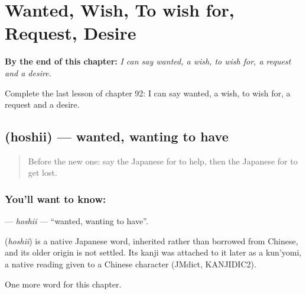 
\chapter{Wanted, Wish, To wish for, Request, Desire}
\label{ch:ja-wanted-wish-to-wish-for-request-desire}

\begin{chapteropening}
\textbf{By the end of this chapter:} \emph{I can say wanted, a wish, to wish for, a request and a desire.}

Complete the last lesson of chapter 92: I can say wanted, a wish, to wish for, a request and a desire.
\end{chapteropening}

\section[\texorpdfstring{\ja{ほしい} (hoshii)}{ほしい (hoshii)}]{ (hoshii) — wanted, wanting to have}

\label{lesson:JA-C92-hoshii}



\begin{quote}
Before the new one: say the Japanese for to help, then the Japanese for to get lost.
\end{quote}

\subsection*{You'll want to know: }
\textbf{} — \emph{hoshii} — \textquotedblleft{}wanted, wanting to have\textquotedblright{}.

\begin{cousinweb}
\textbf{} (\emph{hoshii}) is a native Japanese word, inherited rather than borrowed from Chinese, and its older origin is not settled. Its kanji was attached to it later as a kun'yomi, a native reading given to a Chinese character (JMdict, KANJIDIC2).
\end{cousinweb}

\begin{grammarlens}[title={What you've built}]
One more word for this chapter.
\end{grammarlens}

